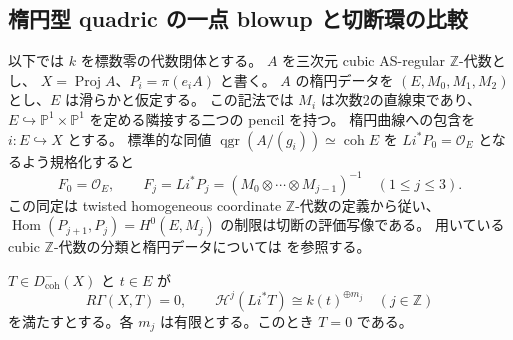 
\subsection{楕円型 quadric の一点 blowup と切断環の比較}
\label{blowup:quadric-comparison}

以下では $k$ を標数零の代数閉体とする。
$A$ を三次元 cubic AS-regular $\mathbb Z$-代数とし、
$X=\operatorname{Proj}A$、$P_i=\pi(e_iA)$ と書く。
$A$ の楕円データを $(E,M_0,M_1,M_2)$ とし、$E$ は滑らかと仮定する。
この記法では $M_i$ は次数2の直線束であり、
$E\hookrightarrow\mathbb P^1\times\mathbb P^1$ を定める隣接する二つの pencil を持つ。
楕円曲線への包含を $i\colon E\hookrightarrow X$ とする。
標準的な同値 $\operatorname{qgr}(A/(g_i))\simeq\operatorname{coh}E$ を
$Li^*P_0=\mathcal O_E$ となるよう規格化すると
\begin{equation}\label{blowup:quadric-restrictions}
 F_0=\mathcal O_E,\qquad
 F_j=Li^*P_j=(M_0\otimes\cdots\otimes M_{j-1})^{-1}
 \quad(1\le j\le3).
\end{equation}
この同定は twisted homogeneous coordinate $\mathbb Z$-代数の定義から従い、
$\operatorname{Hom}(P_{j+1},P_j)=H^0(E,M_j)$ の制限は切断の評価写像である。
用いている cubic $\mathbb Z$-代数の分類と楕円データについては
\cite[命題5.1.2、\S5.5]{VdBQuadrics} を参照する。

\begin{lemma}[一点上の半単純な制限による消滅]
\label{blowup:quadric-kernel}
$T\in D^-_{\mathrm{coh}}(X)$ と $t\in E$ が
\[
 R\Gamma(X,T)=0,\qquad
 \mathcal H^j(Li^*T)\cong k(t)^{\oplus m_j}
 \quad(j\in\mathbb Z)
\]
を満たすとする。各 $m_j$ は有限とする。このとき $T=0$ である。
\end{lemma}

